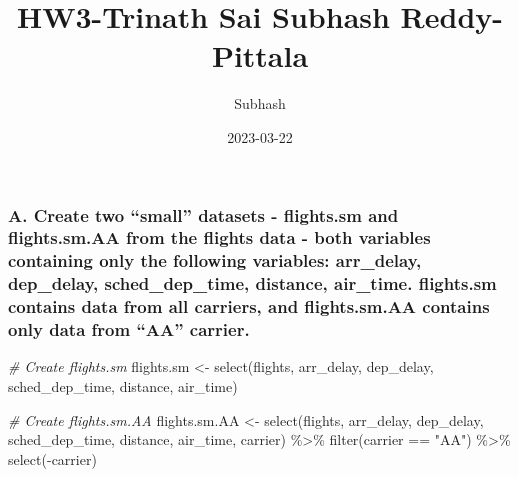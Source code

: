\documentclass[
]{article}
\title{HW3-Trinath Sai Subhash Reddy-Pittala}
\author{Subhash}
\date{2023-03-22}
\newenvironment{Shaded}{\begin{snugshade}}{\end{snugshade}}
\newcommand{\CommentTok}[1]{\textcolor[rgb]{0.56,0.35,0.01}{\textit{#1}}}
\newcommand{\FunctionTok}[1]{\textcolor[rgb]{0.00,0.00,0.00}{#1}}
\newcommand{\NormalTok}[1]{#1}
\newcommand{\OtherTok}[1]{\textcolor[rgb]{0.56,0.35,0.01}{#1}}
\newcommand{\SpecialCharTok}[1]{\textcolor[rgb]{0.00,0.00,0.00}{#1}}
\newcommand{\StringTok}[1]{\textcolor[rgb]{0.31,0.60,0.02}{#1}}
\begin{document}
\maketitle

\hypertarget{a.-create-two-small-datasets---flights.sm-and-flights.sm.aa-from-the-flights-data---both-variables-containing-only-the-following-variables-arr_delay-dep_delay-sched_dep_time-distance-air_time.-flights.sm-contains-data-from-all-carriers-and-flights.sm.aa-contains-only-data-from-aa-carrier.}{%
\subsubsection{A. Create two ``small'' datasets - flights.sm and
flights.sm.AA from the flights data - both variables containing only the
following variables: arr\_delay, dep\_delay, sched\_dep\_time, distance,
air\_time. flights.sm contains data from all carriers, and flights.sm.AA
contains only data from ``AA''
carrier.}\label{a.-create-two-small-datasets---flights.sm-and-flights.sm.aa-from-the-flights-data---both-variables-containing-only-the-following-variables-arr_delay-dep_delay-sched_dep_time-distance-air_time.-flights.sm-contains-data-from-all-carriers-and-flights.sm.aa-contains-only-data-from-aa-carrier.}}

\begin{Shaded}
\begin{Highlighting}[]
\CommentTok{\# Create flights.sm}
\NormalTok{flights.sm }\OtherTok{\textless{}{-}} \FunctionTok{select}\NormalTok{(flights, arr\_delay, dep\_delay, sched\_dep\_time,}
\NormalTok{    distance, air\_time)}

\CommentTok{\# Create flights.sm.AA}
\NormalTok{flights.sm.AA }\OtherTok{\textless{}{-}} \FunctionTok{select}\NormalTok{(flights, arr\_delay, dep\_delay, sched\_dep\_time,}
\NormalTok{    distance, air\_time, carrier) }\SpecialCharTok{\%\textgreater{}\%}
    \FunctionTok{filter}\NormalTok{(carrier }\SpecialCharTok{==} \StringTok{"AA"}\NormalTok{) }\SpecialCharTok{\%\textgreater{}\%}
    \FunctionTok{select}\NormalTok{(}\SpecialCharTok{{-}}\NormalTok{carrier)}
\end{Highlighting}
\end{Shaded}
\end{document}

